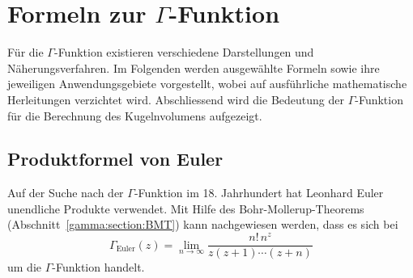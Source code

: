 \section{Formeln zur $\Gamma$-Funktion\label{gamma:section:formulas}}

Für die $\Gamma$-Funktion existieren verschiedene Darstellungen und Näherungsverfahren.
Im Folgenden werden ausgewählte Formeln sowie ihre jeweiligen Anwendungsgebiete vorgestellt, wobei auf ausführliche mathematische Herleitungen verzichtet wird.
Abschliessend wird die Bedeutung der $\Gamma$-Funktion für die Berechnung des Kugelnvolumens aufgezeigt.

\subsection{Produktformel von Euler}

Auf der Suche nach der $\Gamma$-Funktion im 18. Jahrhundert hat Leonhard Euler unendliche Produkte verwendet.
Mit Hilfe des Bohr-Mollerup-Theorems (Abschnitt~\ref{gamma:section:BMT}) kann nachgewiesen werden, dass es sich bei
%
%
%
\begin{equation}
\label{gamma-eq:product-formula-euler}
    \Gamma_{\text{Euler}}(z) = \lim_{n \to \infty} \frac{n!\,n^z}{z(z+1)\cdots(z+n)}
\end{equation}
um die $\Gamma$-Funktion handelt.

